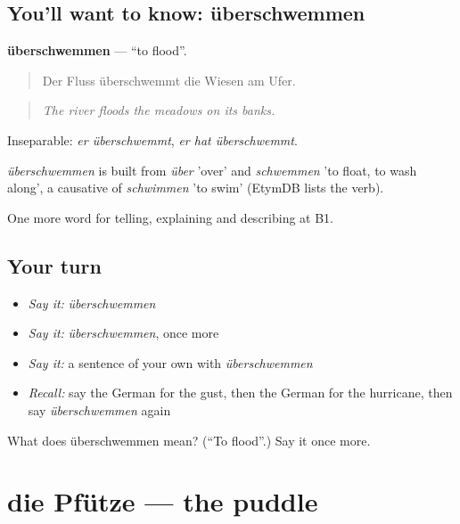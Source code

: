 \subsection*{You'll want to know: überschwemmen}
\textbf{überschwemmen} — \textquotedblleft{}to flood\textquotedblright{}.

\begin{quote}
Der Fluss überschwemmt die Wiesen am Ufer.
\end{quote}

\begin{quote}
\emph{The river floods the meadows on its banks.}
\end{quote}

Inseparable: \emph{er überschwemmt}, \emph{er hat überschwemmt}.

\begin{cousinweb}
\emph{überschwemmen} is built from \emph{über} 'over' and \emph{schwemmen} 'to float, to wash along', a causative of \emph{schwimmen} 'to swim' (EtymDB lists the verb).
\end{cousinweb}

\begin{grammarlens}[title={What you've built}]
One more word for telling, explaining and describing at B1.
\end{grammarlens}

\subsection*{Your turn}
\begin{itemize}
\raggedright
  \item \emph{Say it:} \emph{überschwemmen}
  \item \emph{Say it:} \emph{überschwemmen}, once more
  \item \emph{Say it:} a sentence of your own with \emph{überschwemmen}
  \item \emph{Recall:} say the German for the gust, then the German for the hurricane, then say \emph{überschwemmen} again
\end{itemize}

\begin{tcolorbox}[breakable,colback=teal!4,colframe=teal!35!black,title={Before you move on}]
What does überschwemmen mean? (\textquotedblleft{}To flood\textquotedblright{}.) Say it once more.
\end{tcolorbox}
\section[die Pfütze]{die Pfütze — the puddle}

